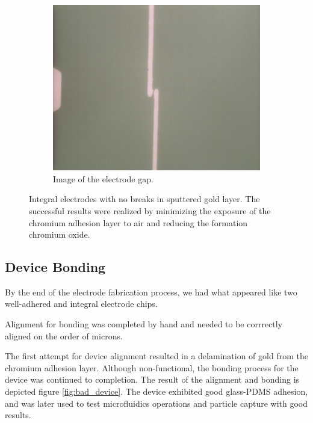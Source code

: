 \begin{figure}[h]
\begin{subfigure}[b]{0.45\textwidth}
        \includegraphics[width=\textwidth]{images/goodElectrodeCloseUp.png}
        \caption{Image of the electrode gap.}
    \end{subfigure}
    \caption{Integral electrodes with no breaks in sputtered gold layer. The successful results were realized by minimizing the exposure of the chromium adhesion layer to air and reducing the formation chromium oxide.}
    \label{fig:good_electrodes}
\end{figure}


\FloatBarrier

\subsection{Device Bonding}

\par By the end of the electrode fabrication process, we had what appeared like two well-adhered and integral electrode chips. 

\par Alignment for bonding was completed by hand and needed to be corrrectly aligned on the order of microns. 

The first attempt for device alignment resulted in a delamination of gold from the chromium adhesion layer. Although non-functional, the bonding process for the device was continued to completion. The result of the alignment and bonding is depicted figure \ref{fig:bad_device}. The device exhibited good glass-PDMS adhesion, and was later used to test microfluidics operations and particle capture with good results.

